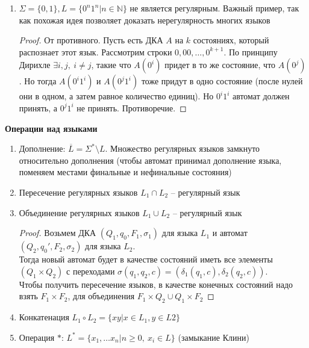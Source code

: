 \begin{enumerate}
\begin{center}
\begin{tikzpicture}[x=0.75pt,y=0.75pt,yscale=-1,xscale=1]
        \end{tikzpicture}
    \end{center}

    \item $\Sigma = \{0, 1\}, L = \{0^n 1^n | n \in \mathbb{N}\}$ не является регулярным. 
    Важный пример, так как похожая идея позволяет доказать нерегулярность многих языков

    \begin{proof}
        От противного. Пусть есть ДКА $A$ на $k$ состояниях, который распознает этот язык. Рассмотрим строки 
        $0, 00, \dots, 0^{k+1}$. По принципу Дирихле $\exists i, j,\ i\neq j$, такие что $A(0^i)$ придет в то же состояние, что $A(0^j)$.
        Но тогда $A(0^i 1^i)$ и $A(0^j 1^i)$ тоже придут в одно состояние (после нулей они в одном, а затем равное количество единиц). Но $0^i 1^i$ автомат должен принять, а $0^j 1^i$ не принять. Противоречие.
    \end{proof}

\end{enumerate}

\textbf{Операции над языками}
\begin{enumerate}
    \item Дополнение: $\overline L = \Sigma^* \setminus L$. Множество регулярных языков замкнуто относительно дополнения (чтобы автомат принимал дополнение языка, поменяем местами финальные и нефинальные состояния)
    \item Пересечение регулярных языков $L_1 \cap L_2$ -- регулярный язык
    \item Объединение регулярных языков $L_1 \cup L_2$ -- регулярный язык
    
    \begin{proof}
        Возьмем ДКА $(Q_1, q_0, F_1, \sigma_1)$ для языка $L_1$ и автомат $(Q_2, q_0', F_2, \sigma_2)$ для языка $L_2$.\\
        Тогда новый автомат будет в качестве состояний иметь все элементы $(Q_1 \times Q_2)$ с переходами $\sigma(q_1, q_2, c) = (\delta_1(q_1, c), \delta_2(q_2, c))$.\\
        Чтобы получить пересечение языков, в качестве конечных состояний надо взять $F_1 \times F_2$, для объединения $F_1 \times Q_2 \cup Q_1 \times F_2$
    \end{proof}
    \item Конкатенация $L_1 \circ L_2 = \{ xy | x \in L_1, y \in L2\}$
    \item Операция $*$: $L^* = \{x_1, \dots x_n | n \geq 0,\ x_i \in L\}$ (замыкание Клини)
\end{enumerate}


